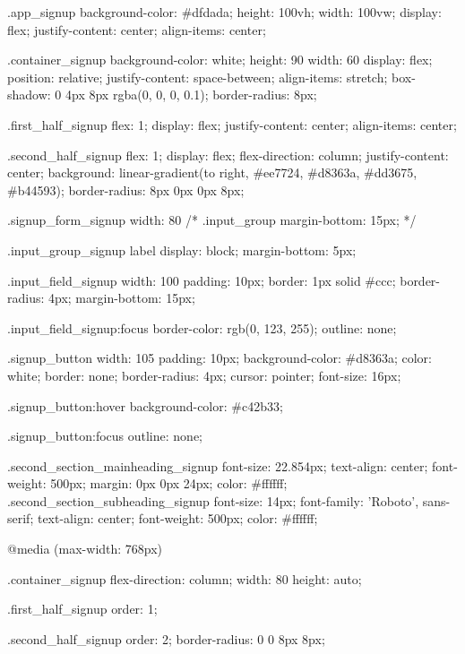 .app_signup {
    background-color: #dfdada;
    height: 100vh;
    width: 100vw;
    display: flex;
    justify-content: center;
    align-items: center;
  }
  
  .container_signup{
    background-color: white;
    height: 90%
    width: 60%
    display: flex;
    position: relative;
    justify-content: space-between;
    align-items: stretch;
    box-shadow: 0 4px 8px rgba(0, 0, 0, 0.1);
    border-radius: 8px;
  }
  
  .first_half_signup {
    flex: 1;
    display: flex;
    justify-content: center;
    align-items: center;
  }
  
  .second_half_signup {
    flex: 1;
    display: flex;
    flex-direction: column;
    justify-content: center;
    background: linear-gradient(to right, #ee7724, #d8363a, #dd3675, #b44593);
    border-radius: 8px 0px 0px 8px;
  }
  
  .signup_form_signup {
    width: 80%
  }
/*   
  .input_group {
    margin-bottom: 15px;
  } */
  
  .input_group_signup label {
    display: block;
    margin-bottom: 5px;
  }
  
  .input_field_signup {
    width: 100%
    padding: 10px;
    border: 1px solid #ccc;
    border-radius: 4px;
    margin-bottom: 15px;
  }
  
  .input_field_signup:focus {
    border-color: rgb(0, 123, 255);
    outline: none;
  }
  
  .signup_button {
    width: 105%
    padding: 10px;
    background-color: #d8363a;
    color: white;
    border: none;
    border-radius: 4px;
    cursor: pointer;
    font-size: 16px;
  }
  
  .signup_button:hover {
    background-color: #c42b33;
  }
  
  .signup_button:focus {
    outline: none;
  }

   
  .second_section_mainheading_signup{
    font-size: 22.854px;
    text-align: center;
    font-weight: 500px;
    margin: 0px 0px 24px;
    color: #ffffff;
  }
  .second_section_subheading_signup{
    font-size: 14px;
    font-family: 'Roboto', sans-serif;
    text-align: center;
    font-weight: 500px;
    color: #ffffff;
  }
  





  @media (max-width: 768px) {
  .container_signup {
    flex-direction: column;
    width: 80%
    height: auto;
  }

  .first_half_signup {
    order: 1;
  }

  .second_half_signup {
    order: 2;
    border-radius: 0 0 8px 8px;
  }
}